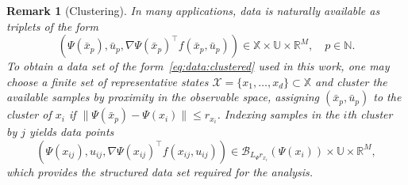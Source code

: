 \documentclass[a4paper, reqno]{amsart}
\newtheorem{remark}[theorem]{Remark}
\begin{document}
\begin{remark}[Clustering]\label{rem:clustering}
In many applications, data is naturally available as triplets of the form
\[
(\Psi(\bar{x}_p), \bar{u}_p, \nabla\Psi(\bar{x}_p)^\top f(\bar{x}_p,\bar{u}_p))
\in \mathbb{X}\times\mathbb{U}\times\mathbb{R}^M,\quad p\in\mathbb{N}.
\]
To obtain a data set of the form~\eqref{eq:data:clustered} used in this work, 
one may choose a finite set of representative states 
$\mathcal{X}=\{x_1,\dots,x_d\}\subset\mathbb{X}$ 
and cluster the available samples by proximity in the observable space, 
assigning $(\bar{x}_p,\bar{u}_p)$ to the cluster of $x_i$ if 
$\|\Psi(\bar{x}_p)-\Psi(x_i)\|\le r_{x_i}$. 
Indexing samples in the $i$th cluster by $j$ yields data points
\[
(\Psi(x_{ij}),u_{ij},\nabla\Psi(x_{ij})^\top f(x_{ij},u_{ij})) 
\in \mathcal{B}_{L_\Psi r_{x_i}}(\Psi(x_i))\times\mathbb{U}\times\mathbb{R}^M,
\]
which provides the structured data set required for the analysis.
\end{remark}
\end{document}
